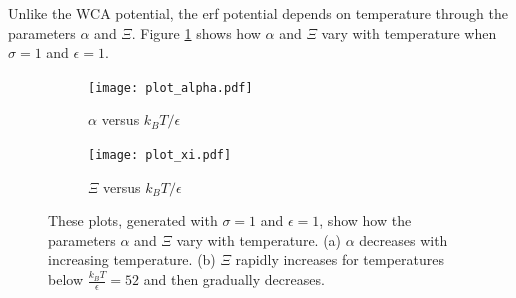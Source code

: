 \documentclass[double,12pt]{beavtex}
\begin{document}

Unlike the WCA potential, the erf potential depends on temperature through the parameters $\alpha$ and $\Xi$. Figure \ref{fig:alphaXivsT} shows how $\alpha$ and $\Xi$ vary with temperature when $\sigma=1$ and $\epsilon=1$. %

 \begin{figure}[h!]
    \centering
    \begin{subfigure}[b]{0.4\linewidth}
      \texttt{[image: plot\_alpha.pdf]}
      \caption{$\alpha$ versus $k_BT/\epsilon$}
    \end{subfigure} 
    \begin{subfigure}[b]{0.4\linewidth}
      \texttt{[image: plot\_xi.pdf]}
      \caption{$\Xi$ versus $k_BT/\epsilon$}
    \end{subfigure} 
    \caption{These plots, generated with $\sigma=1$ and $\epsilon=1$, show how the parameters $\alpha$ and $\Xi$ vary with temperature. (a) $\alpha$ decreases with increasing temperature. (b) $\Xi$ rapidly increases for temperatures below $\frac{k_BT}{\epsilon}=52$ and then gradually decreases.}
    \label{fig:alphaXivsT}
    \end{figure} 


\end{document}
